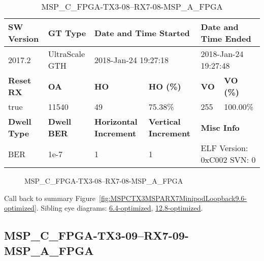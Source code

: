 \begin{table}[h]
\centering
\caption{MSP\_C\_FPGA-TX3-08--RX7-08-MSP\_A\_FPGA}
\label{tab:MSPCFPGATX308RX708MSPAFPGA9.6-optimized}
\begin{tabular}{@{}|l|l|l|l|l|l|@{}}
\toprule
\textbf{SW Version}                & \textbf{GT Type}   & \multicolumn{2}{l|}{\textbf{Date and Time Started}}            & \multicolumn{2}{l|}{\textbf{Date and Time Ended}}        \\ \midrule
2017.2                       & UltraScale GTH          & \multicolumn{2}{l|}{2018-Jan-24 19:27:18}                   & \multicolumn{2}{l|}{2018-Jan-24 19:27:48}               \\ \midrule
\textbf{Reset RX}                  & \textbf{OA} & \textbf{HO}   & \textbf{HO (\%)} & \textbf{VO} & \textbf{VO (\%)} \\ \midrule
true & 11540        & 49          & 75.38\%        & 255        & 100.00\%       \\ \midrule
\textbf{Dwell Type}                & \textbf{Dwell BER} & \textbf{Horizontal Increment} & \textbf{Vertical Increment}    & \multicolumn{2}{l|}{\textbf{Misc Info}}                  \\ \midrule
BER                            & 1e-7        & 1        & 1           & \multicolumn{2}{l|}{ELF Version: 0xC002 SVN: 0}                         \\ \bottomrule
\end{tabular}
\end{table}

\begin{figure}[h]
\caption{MSP\_C\_FPGA-TX3-08--RX7-08-MSP\_A\_FPGA} \label{fig:MSPCFPGATX308RX708MSPAFPGA9.6-optimized}
\end{figure}

Call back to summary Figure~\ref{fig:MSPCTX3MSPARX7MinipodLoopback9.6-optimized}.
Sibling eye diagrams: \hyperref[sec:MSPCFPGATX308RX708MSPAFPGA6.4-optimized]{6.4-optimized}, \hyperref[sec:MSPCFPGATX308RX708MSPAFPGA12.8-optimized]{12.8-optimized}.

\clearpage
\newpage


\subsection{MSP\_C\_FPGA-TX3-09--RX7-09-MSP\_A\_FPGA}\label{sec:MSPCFPGATX309RX709MSPAFPGA9.6-optimized}

